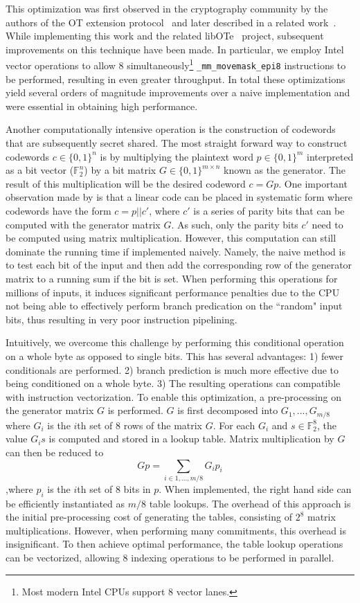 This optimization was first observed in the cryptography community by the authors of the OT extension protocol~\cite{DBLP:conf/crypto/KellerOS15} and later described in a related work~\cite{DBLP:conf/ccs/KellerOS16}. While implementing this work and the related libOTe~\cite{libOTe} project, subsequent improvements on this technique have been made. In particular, we employ Intel vector operations to allow 8 simultaneously\footnote{Most modern Intel CPUs support 8 vector lanes.} \texttt{\_mm\_movemask\_epi8} instructions to be performed, resulting in even greater throughput. In total these optimizations yield several orders of magnitude improvements over a naive implementation and were essential in obtaining high performance.


Another computationally intensive operation is the construction of codewords that are subsequently secret shared. The most straight forward way to construct codewords $c\in\{0,1\}^n$     is by multiplying the plaintext word $p\in\{0,1\}^m$ interpreted as a bit vector ($\mathbb{F}_2^n$) by a bit matrix $G\in\{0,1\}^{m\times n}$ known as the generator. The result of this multiplication will be the desired codeword $c=Gp$. One important observation made by \cite{DBLP:conf/tcc/FrederiksenJNT16} is that a linear code can be placed in systematic form where codewords have the form $c=p||c'$, where $c'$ is a series of parity bits that can be computed with the generator matrix $G$. As such, only the parity bits $c'$ need to be computed using matrix multiplication. However, this computation can still dominate the running time if implemented naively. Namely, the naive method is to test each bit of the input and then add the corresponding row of the generator matrix to a running sum if the bit is set. When performing this operations for millions of inputs, it induces significant performance penalties due to the CPU not being able to effectively perform branch predication on the ``random" input bits, thus resulting in very poor instruction pipelining. 

Intuitively, we overcome this challenge by performing this conditional operation on a whole byte as opposed to single bits. This has several advantages: 1) fewer conditionals are performed. 2) branch prediction is much more effective due to being conditioned on a whole byte.  3) The resulting operations can compatible with instruction vectorization. To enable this optimization, a pre-processing on the generator matrix $G$ is performed. $G$ is first decomposed into $G_1,...,G_{m/8}$ where $G_i$ is the $i$th set of 8 rows of the matrix $G$. For each $G_i$ and $s\in\mathbb{F}_2^8$, the value $G_is$ is computed and stored in a lookup table. Matrix multiplication by $G$ can then be reduced to
\[
   Gp = \sum_{i\in {1,...,m/8}} G_ip_i
\] 
,where $p_i$ is the $i$th set of 8 bits in $p$. When implemented, the right hand side can be efficiently instantiated as $m/8$ table lookups. The overhead of this approach is the initial pre-processing cost of generating the tables, consisting of $2^8$ matrix multiplications. However, when performing many commitments, this overhead is insignificant. To then achieve optimal performance, the table lookup operations can be vectorized, allowing 8 indexing operations to be performed in parallel. 

